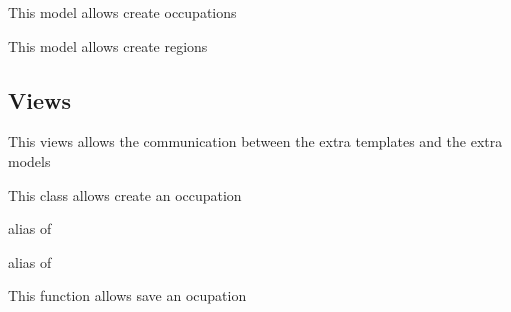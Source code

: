 \documentclass[letterpaper,10pt,english]{sphinxmanual}
\begin{document}
\begin{fulllineitems}
\label{modules/extras:apps.extras.models.Occupation}
This model allows create occupations

\end{fulllineitems}


\begin{fulllineitems}
\label{modules/extras:apps.extras.models.Region}
This model allows create regions

\end{fulllineitems}



\subsection{Views}
\label{modules/extras:views}
This views allows the communication between the extra templates and the extra models
\label{modules/extras:module-apps.extras.views}

\begin{fulllineitems}
\label{modules/extras:apps.extras.views.OccupationCreateView}
This class allows create an occupation

\begin{fulllineitems}
\label{modules/extras:apps.extras.views.OccupationCreateView.form_class}
alias of 

\end{fulllineitems}


\begin{fulllineitems}
\label{modules/extras:apps.extras.views.OccupationCreateView.model}
alias of 

\end{fulllineitems}


\begin{fulllineitems}
\label{modules/extras:apps.extras.views.OccupationCreateView.post}
This function allows save an ocupation

\end{fulllineitems}


\end{fulllineitems}
\end{document}
